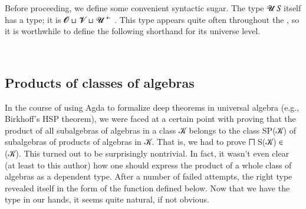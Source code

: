 \documentclass[a4paper,UKenglish,cleveref,autoref,thm-restate,11pt]{lipics-v2021}
\begin{document}
Before proceeding, we define some convenient syntactic sugar. The type  \ab 𝓤 \ab 𝑆 itself has a type; it is \ab 𝓞 \as ⊔ \ab 𝓥 \as ⊔ \ab 𝓤 \af ⁺ \af ̇ . This type appears quite often throughout the \ualib, so it is worthwhile to define the following shorthand for its universe level.
\ccpad
\begin{code}%
\>[0]\AgdaSpace{}%
\AgdaSymbol{:}\AgdaSpace{}%
\AgdaSpace{}%
\AgdaSpace{}%
\<%
\\
\>[0]\AgdaSpace{}%
\AgdaSpace{}%
\AgdaSymbol{=}\AgdaSpace{}%
\AgdaSpace{}%
\AgdaSpace{}%
\AgdaSpace{}%
\AgdaSpace{}%
\AgdaSpace{}%
\<%
\end{code}

\subsection{Products of classes of algebras}\label{products-of-classes-of-algebras}
In the course of using Agda to formalize deep theorems in universal algebra (e.g., Birkhoff's HSP theorem), we were faced at a certain point with proving that the product of all subalgebras of algebras in a class 𝒦 belongs to the class SP(𝒦) of subalgebras of products of algebras in 𝒦.  That is, we had to prove \af ⨅ \ad S(\ab 𝒦) \af ∈ (\ab 𝒦). This turned out to be surprisingly nontrivial. In fact, it wasn't even clear (at least to this author) how one should express the product of a whole class of algebras as a dependent type. After a number of failed attempts, the right type revealed itself in the form of the  function defined below. Now that we have the type in our hands, it seems quite natural, if not obvious.
\end{document}
